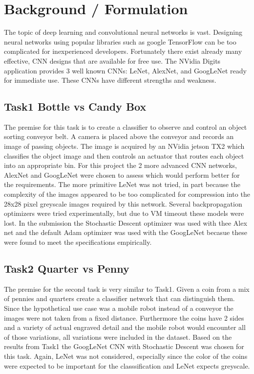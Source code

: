 \documentclass[10pt,journal,compsoc]{IEEEtran}
\begin{document}
\section{Background / Formulation}
The topic of deep learning and convolutional neural networks is vast. Designing neural networks using popular libraries such as google TensorFlow can be too complicated for inexperienced developers. Fortunately there exist already many effective, CNN designs that are available for free use. The NVidia Digits application provides 3 well known CNNs: LeNet, AlexNet, and GoogLeNet ready for immediate use. These CNNs have different strengths and weakness.

\subsection{Task1 Bottle vs Candy Box}
The premise for this task is to create a classifier to observe and control an object sorting conveyor belt. A camera is placed above the conveyor and records an image of passing objects. The image is acquired by an NVidia jetson TX2 which classifies the object image and then controls an actuator that routes each object into an appropriate bin. For this project the 2 more advanced CNN networks, AlexNet and GoogLeNet were chosen to assess which would perform better for the requirements. The more primitive LeNet was not tried, in part because the complexity of the images appeared to be too complicated for compression into the 28x28 pixel greyscale images required by this network.
Several backpropagation optimizers were tried experimentally, but due to VM timeout these models were lost. In the submission the Stochastic Descent optimizer was used with thee Alex net and the default Adam optimizer was used with the GoogLeNet becasue these were found to meet the specifications empirically.

\subsection{Task2 Quarter vs Penny}
The premise for the second task is very similar to Task1. Given a coin from a mix of pennies and quarters create a classifier network that can distinguish them. Since the hypothetical use case was a mobile robot instead of a conveyor the images were not taken from a fixed distance. Furthermore the coins have 2 sides and a variety of actual engraved detail and the mobile robot would encounter all of those variations, all variations were included in the dataset. Based on the results from Task1 the GoogLeNet CNN with Stochastic Descent was chosen for this task. Again, LeNet was not considered, especially since the color of the coins were expected to be important for the classsification and LeNet expects greyscale. 
\end{document}
